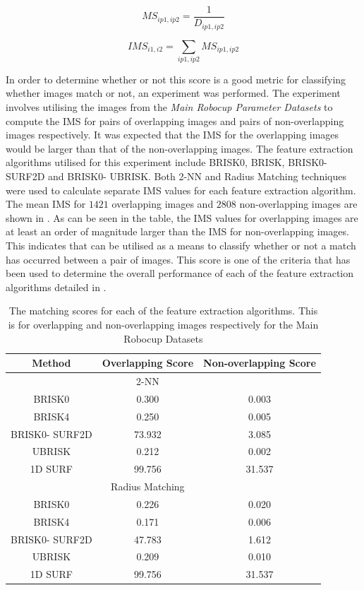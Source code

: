 \documentclass{report}
\begin{document}
\begin{equation}
MS_{ip1, ip2} = \frac{1}{D_{ip1, ip2}}
\label{eqn:inverseDistance}
\end{equation}

\begin{equation}
IMS_{i1, i2} = \sum_{ip1, ip2} MS_{ip1, ip2}
\label{eqn:ims}
\end{equation}

In order to determine whether or not this score is a good metric for classifying whether images match or not, an experiment was performed. The experiment involves utilising the images from the \textit{Main Robocup Parameter Datasets} to compute the IMS for pairs of overlapping images and pairs of non-overlapping images respectively. It was expected that the IMS for the overlapping images would be larger than that of the non-overlapping images. The feature extraction algorithms utilised for this experiment include BRISK0, BRISK, BRISK0-SURF2D and BRISK0- UBRISK. Both 2-NN and Radius Matching techniques were used to calculate separate IMS values for each feature extraction algorithm.\\

The mean IMS for $1421$ overlapping images and $2808$ non-overlapping images are shown in . As can be seen in the table, the IMS values for overlapping images are at least an order of magnitude larger than the IMS for non-overlapping images. This indicates that  can be utilised as a means to classify whether or not a match has occurred between a pair of images. This score is one of the criteria that has been used to determine the overall performance of each of the feature extraction algorithms detailed in .\\

\begin{table}
\caption{The matching scores for each of the feature extraction algorithms. This is for overlapping and non-overlapping images respectively for the Main Robocup Datasets}
\begin{tabular}{|c|c|c|}
\hline 
Method & Overlapping Score & Non-overlapping Score\tabularnewline
\hline 
\hline 
 & 2-NN & \tabularnewline
\hline 
BRISK0 & 0.300 & 0.003\tabularnewline
\hline 
BRISK4 & 0.250 & 0.005\tabularnewline
\hline 
BRISK0- SURF2D & 73.932 & 3.085\tabularnewline
\hline 
UBRISK & 0.212 & 0.002\tabularnewline
\hline 
1D SURF & 99.756 & 31.537\tabularnewline
\hline 
 & Radius Matching & \tabularnewline
\hline 
BRISK0 & 0.226 & 0.020\tabularnewline
\hline 
BRISK4 & 0.171 & 0.006\tabularnewline
\hline 
BRISK0- SURF2D & 47.783 & 1.612\tabularnewline
\hline 
UBRISK & 0.209 & 0.010\tabularnewline
\hline 
1D SURF & 99.756 & 31.537\tabularnewline
\hline 
\end{tabular}
\label{tab:matchingScoreCompare}
\end{table}
\end{document}
